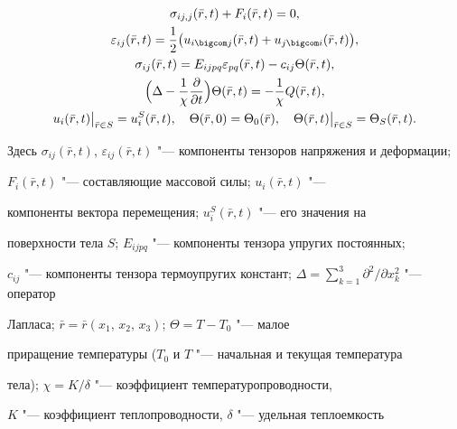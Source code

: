 \begin{gather}

\label{makarova:eq1}

\sigma _{ij,j} (\bar {r} , t)+F_i (\bar{r} , t)=0,\\

\label{makarova:eq2}

\varepsilon _{ij} (\bar{r} , t)=\frac{1}{2}\bigl( u_{i \bigcom j} (\bar {r} , t)+u_{j \bigcom i}

(\bar {r} , t) \bigr),\\

\label{makarova:eq3}

\sigma _{ij} (\bar {r} , t)=E_{ijpq}\varepsilon _{pq} (\bar {r} , t)-c_{ij} \Theta (\bar {r} , t),\\

\label{makarova:eq4}

\Bigl( \Delta -\frac{1}{\chi}\frac{\partial}{\partial t}\Bigr)\Theta (\bar {r} , t)=-\frac{1}{\chi }Q(\bar{r} , t),\\

u_i (\bar {r} , t)\big|_{\bar {r}\in S}=u_i^S (\bar {r} , t),\quad 

\Theta (\bar {r} , 0)=\Theta _0 (\bar {r}),\quad 

\Theta (\bar {r} , t)\big|_{\bar {r}\in S } = \Theta _S (\bar {r} , t).

\end{gather}

Здесь $\sigma_{ij} (\bar{r} , t)$, $\varepsilon_{ij} (\bar{r} , t)$ "--- компоненты тензоров напряжения и деформации;

$F_i (\bar{r} , t)$ "--- составляющие массовой силы; $u_i (\bar {r} , t)$ "---

компоненты вектора перемещения; $u_i^S (\bar {r} , t)$ "--- его значения на

поверхности тела $S$; $E_{ijpq} $ "--- компоненты тензора упругих постоянных;

$c_{ij} $ "--- компоненты тензора термоупругих констант; $\Delta

=\sum_{k=1}^3 {\partial ^2}/{\partial x_k^2 }$ "--- оператор

Лапласа; $\bar {r}=\bar {r}(x_1,\,x_2,\,x_3 )$; $\Theta =T-T_0$ "--- малое

приращение температуры ($T_0 $ и $T$ "--- начальная и текущая температура

тела); $\chi ={K}/{\delta }$ "--- коэффициент температуропроводности,

$K$ "--- коэффициент теплопроводности, $\delta $ "--- удельная теплоемкость


